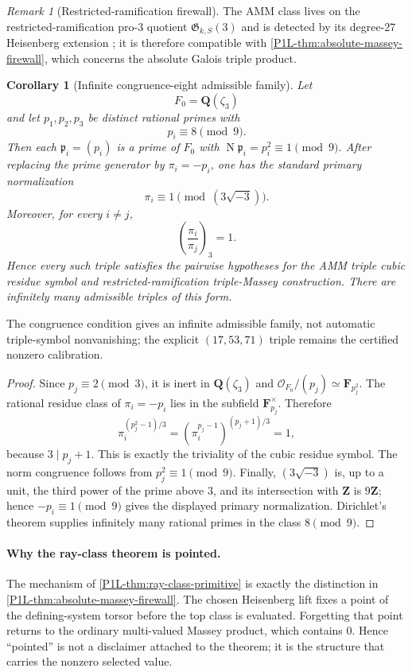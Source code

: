 \documentclass[11pt]{article}
\newtheorem{corollary}[theorem]{Corollary}
\theoremstyle{remark}
\newtheorem{remark}[theorem]{Remark}
\begin{document}
\begin{remark}[Restricted-ramification firewall]
\label{P1L-rem:amm-restricted-firewall}
The AMM class lives on the restricted-ramification pro-\(3\) quotient
\(\mathfrak G_{k,S}(3)\) and is detected by its degree-\(27\) Heisenberg
extension \cite{AMM}; it is therefore compatible with
\cref{P1L-thm:absolute-massey-firewall}, which concerns the absolute Galois
triple product.
\end{remark}

\begin{corollary}[Infinite congruence-eight admissible family]
\label{P1L-prop:amm-eight-mod-nine-family}
Let
\[
 F_0=\mathbf Q(\zeta_3)
\]
and let $p_1,p_2,p_3$ be distinct rational primes with
\[
 p_i\equiv8\pmod 9.
\]
Then each $\mathfrak p_i=(p_i)$ is a prime of $F_0$ with
$\operatorname N\mathfrak p_i=p_i^2\equiv1\pmod9$.  After replacing the
prime generator by $\pi_i=-p_i$, one has the standard primary normalization
\[
 \pi_i\equiv1\pmod{(3\sqrt{-3})}.
\]
Moreover, for every $i\ne j$,
\[
 \boxed{
 \left(\frac{\pi_i}{\pi_j}\right)_3=1.}
\]
Hence every such triple satisfies the pairwise hypotheses for the AMM triple
cubic residue symbol and restricted-ramification triple-Massey construction.
There are infinitely many admissible triples of this form.
\end{corollary}

The congruence condition gives an infinite admissible family, not automatic triple-symbol nonvanishing; the explicit \((17,53,71)\) triple remains the certified nonzero calibration.

\begin{proof}
Since $p_j\equiv2\pmod3$, it is inert in $\mathbf Q(\zeta_3)$ and
$\mathcal O_{F_0}/(p_j)\simeq\mathbf F_{p_j^2}$.  The rational residue class
of $\pi_i=-p_i$ lies in the subfield $\mathbf F_{p_j}^{\times}$.  Therefore
\[
 \pi_i^{(p_j^2-1)/3}
 =\left(\pi_i^{p_j-1}\right)^{(p_j+1)/3}
 =1,
\]
because $3\mid p_j+1$.  This is exactly the triviality of the cubic residue
symbol.  The norm congruence follows from $p_j^2\equiv1\pmod9$.  Finally,
$(3\sqrt{-3})$ is, up to a unit, the third power of the prime above $3$, and
its intersection with $\mathbf Z$ is $9\mathbf Z$; hence
$-p_i\equiv1\pmod9$ gives the displayed primary normalization.  Dirichlet's
theorem supplies infinitely many rational primes in the class $8\pmod9$.
\end{proof}

\paragraph{Why the ray-class theorem is pointed.}
The mechanism of \cref{P1L-thm:ray-class-primitive} is exactly the distinction in
\cref{P1L-thm:absolute-massey-firewall}.  The chosen Heisenberg lift fixes a
point of the defining-system torsor before the top class is evaluated.
Forgetting that point returns to the ordinary multi-valued Massey product,
which contains $0$.  Hence ``pointed'' is not a disclaimer attached to the
theorem; it is the structure that carries the nonzero selected value.
\end{document}
